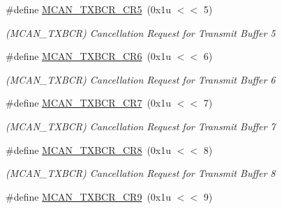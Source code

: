 \begin{DoxyCompactItemize}
\mbox{\label{group__SAME70__MCAN_ga7754c7fc2be7050d4b3b7faa21e0218b}} 
\#define \mbox{\hyperlink{group__SAME70__MCAN_ga7754c7fc2be7050d4b3b7faa21e0218b}{M\+C\+A\+N\+\_\+\+T\+X\+B\+C\+R\+\_\+\+C\+R5}}~(0x1u $<$$<$ 5)
\begin{DoxyCompactList}\small\item\em (M\+C\+A\+N\+\_\+\+T\+X\+B\+CR) Cancellation Request for Transmit Buffer 5 \end{DoxyCompactList}\item 
\mbox{\label{group__SAME70__MCAN_gaf8a2a2116a35c6c61d7be46ed3409c95}} 
\#define \mbox{\hyperlink{group__SAME70__MCAN_gaf8a2a2116a35c6c61d7be46ed3409c95}{M\+C\+A\+N\+\_\+\+T\+X\+B\+C\+R\+\_\+\+C\+R6}}~(0x1u $<$$<$ 6)
\begin{DoxyCompactList}\small\item\em (M\+C\+A\+N\+\_\+\+T\+X\+B\+CR) Cancellation Request for Transmit Buffer 6 \end{DoxyCompactList}\item 
\mbox{\label{group__SAME70__MCAN_ga81240934431c58832c50e926526d2d84}} 
\#define \mbox{\hyperlink{group__SAME70__MCAN_ga81240934431c58832c50e926526d2d84}{M\+C\+A\+N\+\_\+\+T\+X\+B\+C\+R\+\_\+\+C\+R7}}~(0x1u $<$$<$ 7)
\begin{DoxyCompactList}\small\item\em (M\+C\+A\+N\+\_\+\+T\+X\+B\+CR) Cancellation Request for Transmit Buffer 7 \end{DoxyCompactList}\item 
\mbox{\label{group__SAME70__MCAN_gae27d4f18641d69144ba17acb17093592}} 
\#define \mbox{\hyperlink{group__SAME70__MCAN_gae27d4f18641d69144ba17acb17093592}{M\+C\+A\+N\+\_\+\+T\+X\+B\+C\+R\+\_\+\+C\+R8}}~(0x1u $<$$<$ 8)
\begin{DoxyCompactList}\small\item\em (M\+C\+A\+N\+\_\+\+T\+X\+B\+CR) Cancellation Request for Transmit Buffer 8 \end{DoxyCompactList}\item 
\mbox{\label{group__SAME70__MCAN_ga7f444b4fcc171e169fa2615e45a29d7e}} 
\#define \mbox{\hyperlink{group__SAME70__MCAN_ga7f444b4fcc171e169fa2615e45a29d7e}{M\+C\+A\+N\+\_\+\+T\+X\+B\+C\+R\+\_\+\+C\+R9}}~(0x1u $<$$<$ 9)
$$
\end{DoxyCompactItemize}
